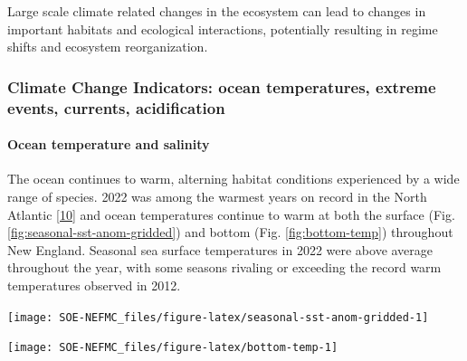 \documentclass[
  10pt,
]{article}
\let\origfigure\figure
\let\endorigfigure\endfigure
\renewenvironment{figure}[1][2] {
    \expandafter\origfigure\expandafter[H]
} {
    \endorigfigure
}
\begin{document}
Large scale climate related changes in the ecosystem can lead to changes in important habitats and ecological interactions, potentially resulting in regime shifts and ecosystem reorganization.

\hypertarget{climate-change-indicators-ocean-temperatures-extreme-events-currents-acidification}{%
\subsubsection{Climate Change Indicators: ocean temperatures, extreme events, currents, acidification}\label{climate-change-indicators-ocean-temperatures-extreme-events-currents-acidification}}

\hypertarget{ocean-temperature-and-salinity}{%
\paragraph{Ocean temperature and salinity}\label{ocean-temperature-and-salinity}}

The ocean continues to warm, alterning habitat conditions experienced by a wide range of species. 2022 was among the warmest years on record in the North Atlantic {[}\protect\hyperlink{ref-cheng_another_2023}{10}{]} and ocean temperatures continue to warm at both the surface (Fig. \ref{fig:seasonal-sst-anom-gridded}) and bottom (Fig. \ref{fig:bottom-temp}) throughout New England. Seasonal sea surface temperatures in 2022 were above average throughout the year, with some seasons rivaling or exceeding the record warm temperatures observed in 2012.

\begin{figure}

{\centering \texttt{[image: SOE-NEFMC\_files/figure-latex/seasonal-sst-anom-gridded-1]} 

}

\caption{New England (EPUs outlined in grey) 2022 seasonal sea surface temperature (SST) anomalies. The anomalies are the difference between the 2022 seasonal means and the long-term (1991-2020) seasonal means.  Seasons are defined as: Jan-Mar for winter, Apr-Jun for spring, Jul-Sep for summer, and Oct-Dec for fall.}\label{fig:seasonal-sst-anom-gridded}
\end{figure}

\begin{figure}

{\centering \texttt{[image: SOE-NEFMC\_files/figure-latex/bottom-temp-1]} 

}

\caption{Annual Georges Bank and Gulf of Maine seasonal bottom temperature anomalies. Data from the last two years (open circles) are from a near-real-time model and are considered preliminary.}\label{fig:bottom-temp}
\end{figure}
\end{document}
